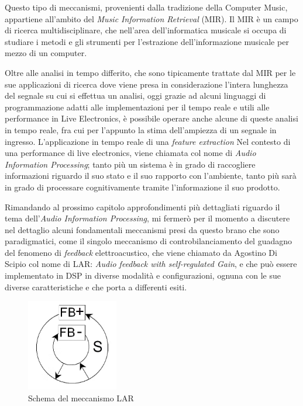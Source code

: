 Questo tipo di meccanismi, provenienti dalla tradizione della Computer Music, appartiene 
all'ambito del \textit{Music Information Retrieval} (MIR).
Il MIR è un campo di ricerca multidisciplinare, che nell'area dell’informatica musicale si occupa di
studiare i metodi e gli strumenti per l’estrazione dell’informazione musicale per mezzo di un
computer.

Oltre alle analisi in tempo differito, che sono tipicamente trattate dal MIR
per le sue applicazioni di ricerca dove viene presa in considerazione
l’intera lunghezza del segnale su cui si effettua un analisi, 
oggi grazie ad alcuni linguaggi di programmazione
adatti alle implementazioni per il tempo reale e utili alle
performance in Live Electronics, è possibile operare anche alcune
di queste analisi in tempo reale, fra cui per l'appunto la stima dell'ampiezza
di un segnale in ingresso.
L'applicazione in tempo reale di una \textit{feature extraction} 
Nel contesto di una performance di live electronics, viene chiamata col nome di
\textit{Audio Information Processing};
tanto più un sistema è in grado di raccogliere informazioni riguardo
il suo stato e il suo rapporto con l'ambiente, tanto più sarà in grado di
processare cognitivamente tramite l'informazione il suo prodotto.

Rimandando al prossimo capitolo approfondimenti più dettagliati riguardo il tema 
dell'\textit{Audio Information Processing}, mi fermerò per il momento a discutere 
nel dettaglio alcuni fondamentali meccanismi presi da questo brano che sono paradigmatici,
come il singolo meccanismo di controbilanciamento del guadagno
del fenomeno di \emph{feedback} elettroacustico, che viene chiamato da Agostino Di Scipio col nome di 
LAR: \textit{Audio feedback with self-regulated Gain},
e che può essere implementato in DSP in diverse modalità e configurazioni,
ognuna con le sue diverse caratteristiche e che porta a differenti esiti.

\begin{figure}[h!]
\begin{center}
\vspace{0.25cm}
\includegraphics[width=4cm]{figures/controlled_larsen_Feedback.png}
\caption{Schema del meccanismo LAR}
\vspace{0.5cm}
\end{center}
\end{figure} 


